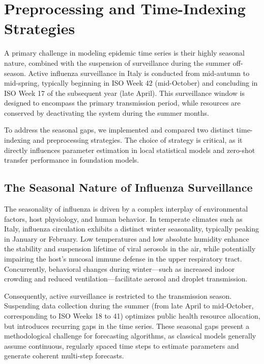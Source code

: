 
\section{Preprocessing and Time-Indexing Strategies}

A primary challenge in modeling epidemic time series is their highly seasonal nature, combined with the suspension of surveillance during the summer off-season. Active influenza surveillance in Italy is conducted from mid-autumn to mid-spring, typically beginning in ISO Week 42 (mid-October) and concluding in ISO Week 17 of the subsequent year (late April). This surveillance window is designed to encompass the primary transmission period, while resources are conserved by deactivating the system during the summer months.

To address the seasonal gaps, we implemented and compared two distinct time-indexing and preprocessing strategies. The choice of strategy is critical, as it directly influences parameter estimation in local statistical models and zero-shot transfer performance in foundation models.

\subsection{The Seasonal Nature of Influenza Surveillance}
The seasonality of influenza is driven by a complex interplay of environmental factors, host physiology, and human behavior. In temperate climates such as Italy, influenza circulation exhibits a distinct winter seasonality, typically peaking in January or February. Low temperatures and low absolute humidity enhance the stability and suspension lifetime of viral aerosols in the air, while potentially impairing the host's mucosal immune defense in the upper respiratory tract. Concurrently, behavioral changes during winter---such as increased indoor crowding and reduced ventilation---facilitate aerosol and droplet transmission.

Consequently, active surveillance is restricted to the transmission season. Suspending data collection during the summer (from late April to mid-October, corresponding to ISO Weeks 18 to 41) optimizes public health resource allocation, but introduces recurring gaps in the time series. These seasonal gaps present a methodological challenge for forecasting algorithms, as classical models generally assume continuous, regularly spaced time steps to estimate parameters and generate coherent multi-step forecasts.

